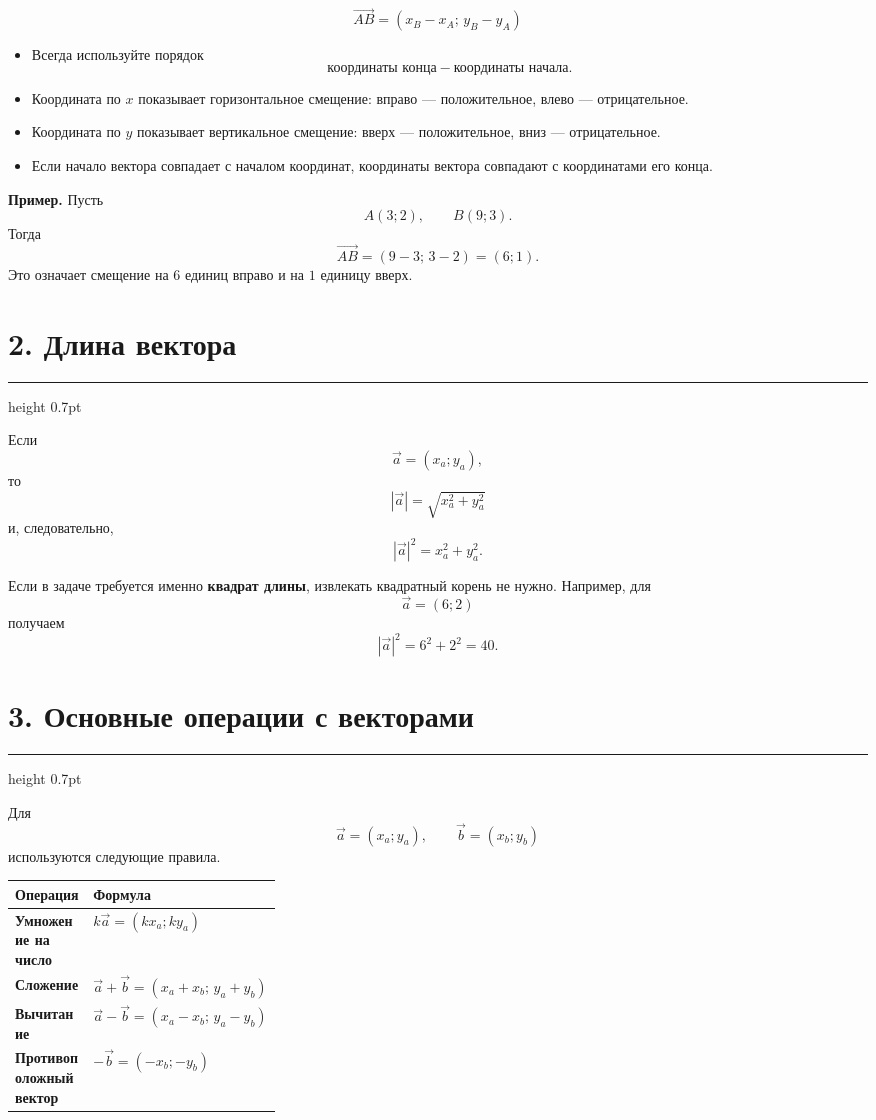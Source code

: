 \documentclass[a4paper,12pt]{article}
\newcommand{\vect}[1]{\vec{#1}}
\newcommand{\checkitem}{\item[$\square$]}
\newcommand{\sectionrule}{%
  \par\vspace{1mm}%
  {\color{accent!60}\hrule height 0.7pt}%
  \vspace{3mm}%
}
\begin{document}
\[
\boxed{
\overrightarrow{AB}
=
(x_B-x_A;\,y_B-y_A)
}
\]

\begin{itemize}[leftmargin=7mm,itemsep=2mm]

\checkitem
Всегда используйте порядок
\[
\text{координаты конца}-\text{координаты начала}.
\]

\checkitem
Координата по \(x\) показывает горизонтальное смещение:
вправо --- положительное, влево --- отрицательное.

\checkitem
Координата по \(y\) показывает вертикальное смещение:
вверх --- положительное, вниз --- отрицательное.

\checkitem
Если начало вектора совпадает с началом координат,
координаты вектора совпадают с координатами его конца.

\end{itemize}

\textbf{Пример.}
Пусть
\[
A(3;2),\qquad B(9;3).
\]
Тогда
\[
\overrightarrow{AB}
=
(9-3;\,3-2)
=
(6;1).
\]
Это означает смещение на \(6\) единиц вправо и на \(1\) единицу вверх.

\section*{2. Длина вектора}
\sectionrule

Если
\[
\vect a=(x_a;y_a),
\]
то
\[
\boxed{|\vect a|=\sqrt{x_a^2+y_a^2}}
\]
и, следовательно,
\[
\boxed{|\vect a|^2=x_a^2+y_a^2}.
\]

Если в задаче требуется именно \textbf{квадрат длины}, извлекать квадратный корень не нужно.
Например, для
\[
\vect a=(6;2)
\]
получаем
\[
|\vect a|^2=6^2+2^2=40.
\]

\section*{3. Основные операции с векторами}
\sectionrule

Для
\[
\vect a=(x_a;y_a),
\qquad
\vect b=(x_b;y_b)
\]
используются следующие правила.

\begin{table}[h!]
\centering
\begin{tabularx}{\linewidth}{@{}>{\bfseries}p{0.31\linewidth}X@{}}
\toprule
Операция & Формула \\
\midrule
Умножение на число
&
\(k\vect a=(kx_a;ky_a)\)
\\[1.5mm]
Сложение
&
\(\vect a+\vect b=(x_a+x_b;\,y_a+y_b)\)
\\[1.5mm]
Вычитание
&
\(\vect a-\vect b=(x_a-x_b;\,y_a-y_b)\)
\\[1.5mm]
Противоположный вектор
&
\(-\vect b=(-x_b;-y_b)\)
\\
\bottomrule
\end{tabularx}
\end{table}
\end{document}
